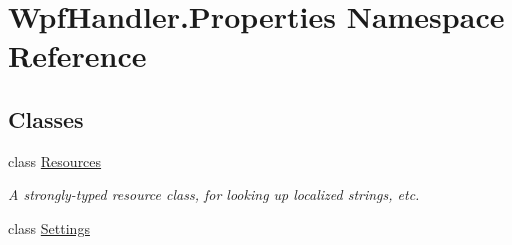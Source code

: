 \hypertarget{namespace_wpf_handler_1_1_properties}{}\section{Wpf\+Handler.\+Properties Namespace Reference}
\label{namespace_wpf_handler_1_1_properties}
\subsection*{Classes}
\begin{DoxyCompactItemize}
\item 
class \mbox{\hyperlink{class_wpf_handler_1_1_properties_1_1_resources}{Resources}}
\begin{DoxyCompactList}\small\item\em A strongly-\/typed resource class, for looking up localized strings, etc. \end{DoxyCompactList}\item 
class \mbox{\hyperlink{class_wpf_handler_1_1_properties_1_1_settings}{Settings}}
\end{DoxyCompactItemize}
